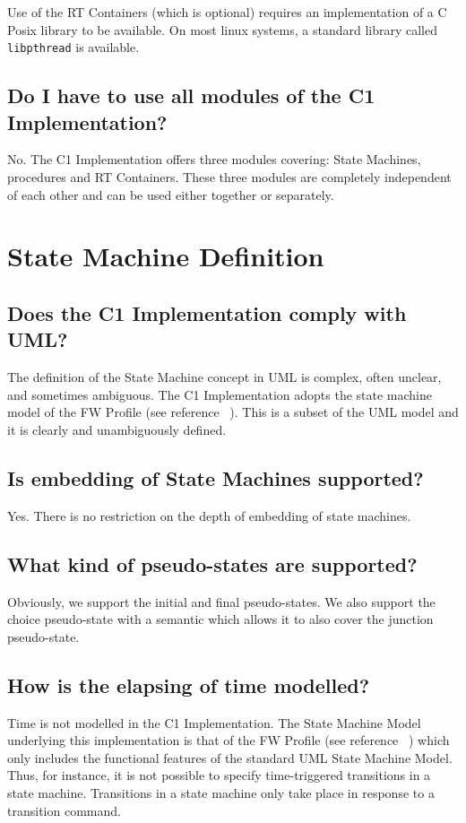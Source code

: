 \documentclass[faq]{../fwprofile}
\begin{document}
Use of the RT Containers (which is optional) requires an implementation of a C Posix library to be available. On most linux systems, a standard library called \texttt{libpthread} is available.  

\subsection{Do I have to use all modules of the C1 Implementation?}
No. The C1 Implementation offers three modules covering: State Machines, procedures and RT Containers. These three modules are completely independent of each other and can be used either together or separately.

\section{State Machine Definition}

\subsection{Does the C1 Implementation comply with UML?}
The definition of the State Machine concept in UML is complex, often unclear, and sometimes ambiguous. The C1 Implementation adopts the state machine model 
of the FW Profile (see reference ~\cite{ref:fwprofile}). This is a subset of the UML model and it is clearly and unambiguously defined. 

\subsection{Is embedding of State Machines supported?}
Yes. There is no restriction on the depth of embedding of state machines.

\subsection{What kind of pseudo-states are supported?}
Obviously, we support the initial and final pseudo-states. We also support the choice pseudo-state with a semantic which allows it to also cover the 
junction pseudo-state. 

\subsection{How is the elapsing of time modelled?}
Time is not modelled in the C1 Implementation. The State Machine Model underlying this implementation is that of the FW Profile 
(see reference ~\cite{ref:fwprofile}) which only 
includes the functional features of the standard UML State Machine Model. Thus, for instance, it is not possible to specify time-triggered transitions 
in a state machine. Transitions in a state machine only take place in response to a transition command. 
\end{document}
